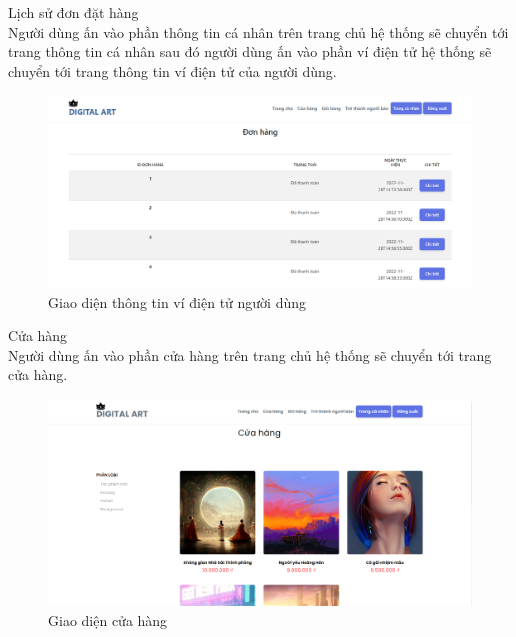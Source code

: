 \documentclass{article}
\begin{document}
{{{{{{{{{{{{{{{{{\begin{center}
\begin{figure}[htp]
		\end{figure}
	\end{center}
}

\newpage
{\large  
	\indent Lịch sử đơn đặt hàng\\
	{\large
		Người dùng ấn vào phần thông tin cá nhân trên trang chủ hệ thống sẽ chuyển tới trang thông tin cá nhân sau đó người dùng ấn vào phần ví điện tử hệ thống sẽ chuyển tới trang thông tin ví điện tử của người dùng.}
	\begin{center}
		\begin{figure}[htp]
			\begin{center}
				\includegraphics[scale=.400]{anh46.png}
			\end{center}
			\caption{Giao diện thông tin ví điện tử người dùng}
			
		\end{figure}
	\end{center}
}

\newpage
{\large  
	\indent Cửa hàng \\
	{\large
		Người dùng ấn vào phần cửa hàng trên trang chủ hệ thống sẽ chuyển tới trang cửa hàng.}
	\begin{center}
		\begin{figure}[htp]
			\begin{center}
				\includegraphics[scale=.400]{anh48.png}
			\end{center}
			\caption{Giao diện cửa hàng}
			

\end{figure}
\end{center}}}}}}}}}}}}}}}}}}
\end{document}

